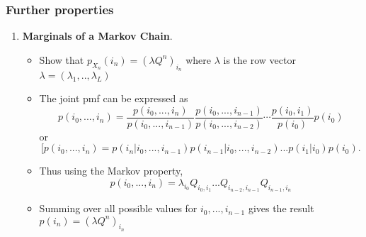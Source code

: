 \documentclass[12pt]{article}
\begin{document}
\subsubsection{Further properties}
\begin{enumerate}
\item \textbf{Marginals of a Markov Chain}.
\begin{itemize}
\item Show that $p_{X_n}(i_n) = (\lambda Q^n)_{i_n}$ where $\lambda$ is the row vector  $\lambda = (\lambda_1,..,\lambda_L)$
\item The joint pmf can be expressed as 
\[p(i_0,...,i_n) = \frac{p(i_0,...,i_n)}{p(i_0,...,i_{n-1})} \frac{p(i_0,...,i_{n-1})}{p(i_0,...,i_{n-2})}\cdots \frac{p(i_0,i_1)}{p(i_0)} p(i_0)\]
or 
\[
[p(i_0,...,i_n) = p(i_n|i_0,...,i_{n-1})p(i_{n-1}|i_0,...,i_{n-2})...p(i_1|i_0)p(i_0).
\]
\item Thus using the Markov property,
\[
p(i_0,...,i_n) = \lambda_{i_0}Q_{i_0,i_1}...Q_{i_{n-2},i_{n-1}}Q_{i_{n-1},i_{n}}
\]
\item Summing over all possible values for $i_0,...,i_{n-1}$ gives the result $p(i_n)=(\lambda Q^n)_{i_n}$
\end{itemize}





\end{enumerate}
\end{document}
